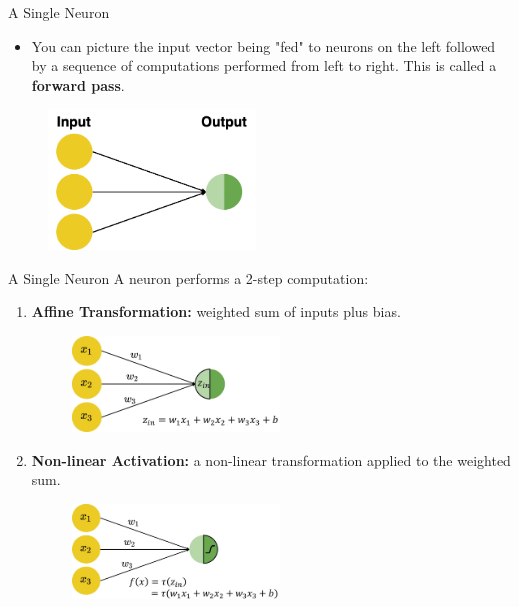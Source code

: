 \begin{vbframe} {A Single Neuron}
\begin{itemize}
\item %
You can picture the input vector being "fed" to neurons on the left followed by a sequence of computations performed from left to right. This is called a \textbf{forward pass}.
\end{itemize}
\vspace{1cm}
\begin{figure}
\includegraphics[width=5.5cm]{figure/forward_pass.png}
\end{figure}
\end{vbframe}

\begin{frame} {A Single Neuron}
A neuron performs a 2-step computation:
\begin{enumerate}
\item \textbf{Affine Transformation:} weighted sum of inputs plus bias.
\begin{figure}
\includegraphics[width=5.5cm]{figure/step1-zin.jpg}
\end{figure}
\item \textbf{Non-linear Activation:} a non-linear transformation applied to the weighted sum.
\begin{figure}
\includegraphics[width=5.5cm]{figure/step2-zin.jpg}
\end{figure}
\end{enumerate}
\end{frame}

